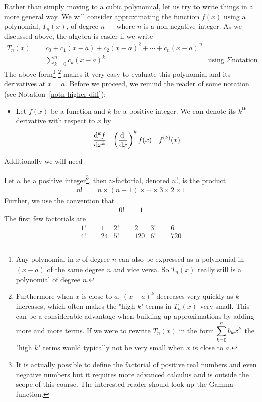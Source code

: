 Rather than simply moving to a cubic polynomial, let us try to write things in a more
general way. We will consider approximating the function $f(x)$ using a polynomial,
$T_n(x)$, of degree $n$ --- where $n$ is a non-negative integer. As we discussed
above, the algebra is easier if we write
\begin{align*}
  T_n(x) &= c_0 + c_1(x-a) + c_2 (x-a)^2 + \cdots + c_n (x-a)^n\\
  &= \sum_{k=0}^n c_k (x-a)^k & \text{using $\Sigma$
notation}
\end{align*}
The above form\footnote{Any polynomial in $x$ of degree $n$ can also be
expressed as a polynomial in $(x-a)$ of the same degree $n$ and vice versa.  So
$T_n(x)$ really still is a polynomial of degree $n$.} \footnote{Furthermore
when $x$ is close to $a$, $(x-a)^k$ decreases very quickly as $k$ increases,
which often makes the "high $k$" terms in $T_n(x)$ very small. This can be a
considerable advantage when building up approximations by adding more and more
terms.  If we were to rewrite  $T_n(x)$ in the form $\displaystyle \sum_{k=0}^n b_k x^k$
the "high $k$" terms would typically not be very small when $x$ is close to
$a$. } makes it very easy to evaluate this polynomial and its derivatives at
$x=a$. Before we proceed, we remind the reader of some notation (see
Notation~\ref{notn higher diff}):
\begin{itemize}
 \item Let $f(x)$ be a function and $k$ be a positive integer. We can denote
its $k^\mathrm{th}$ derivative with respect to $x$ by
\begin{align*}
  \ddiff{k}{f}{x} && \left( \diff{}{x}\right)^k f(x) && f^{(k)}(x)
\end{align*}
\end{itemize}

Additionally we will need
\begin{defn}[Factorial]\label{def_3_4_1}
  Let $n$ be a positive integer\footnote{It is actually possible to define the
factorial of positive real numbers and even negative numbers but it requires more
advanced calculus and is outside the scope of this course. The interested reader should
look up the Gamma function.}, then $n$-factorial, denoted $n!$, is the product
  \begin{align*}
    n! &= n \times (n-1) \times \cdots \times 3 \times 2 \times 1
  \end{align*}
  Further, we use the convention that
  \begin{align*}
  0! &= 1
  \end{align*}
  The first few factorials are
\begin{align*}
  1! &=1 &
  2! &=2 &
  3! &=6 \\
  4! &=24 &
  5! &=120 &
  6! &=720
\end{align*}
\end{defn}


